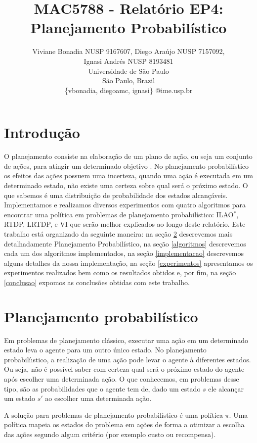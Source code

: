 \documentclass[12pt,a4paper]{article}
\title{MAC5788 - Relatório EP4: Planejamento Probabilístico}
\author{Viviane Bonadia NUSP 9167607, Diego Ara\'{u}jo NUSP 7157092, \\ Ignasi Andr\'{e}s NUSP 8193481\\
Universidade de S\~{a}o Paulo\\
S\~{a}o Paulo, Brazil\\ \{vbonadia, diegoamc, ignasi\} @ime.usp.br}
\begin{document}
\maketitle

\section{Introdução}


O planejamento consiste na elaboração de um plano de ação, ou seja um conjunto de ações, para atingir um determinado objetivo \cite{russell1995artificial}. No planejamento probabilístico os efeitos das ações possuem uma incerteza, quando uma ação é executada em um determinado estado, não existe uma certeza sobre qual será o próximo estado. O que sabemos é uma distribuição de probabilidade dos estados alcançáveis.
Implementamos e realizamos diversos experimentos com quatro algoritmos para encontrar uma política em problemas de planejamento probabilístico: ILAO$^*$, RTDP, LRTDP,  e VI que serão melhor explicados ao longo deste relatório. Este trabalho está organizado da seguinte maneira: na seção \ref{planejamento} descrevemos mais detalhadamente Planejamento Probabilístico, na seção \ref{algoritmos} descrevemos cada um dos algoritmos implementados, na seção \ref{implementacao} descrevemos alguns detalhes da nossa implementação, na seção \ref{experimentos} apresentamos os experimentos realizados bem como os resultados obtidos e, por fim, na seção \ref{conclusao} expomos as conclusões obtidas com este trabalho.


\section{Planejamento probabilístico} \label{planejamento}


Em problemas de planejamento clássico, executar uma ação em um determinado estado leva o agente para um outro único estado. No planejamento probabilíıstico, a realização de uma ação pode levar o agente à diferentes estados. Ou seja, não é possível saber com certeza qual será o próximo estado do agente após escolher uma determinada ação. O que conhecemos, em problemas desse tipo, são as probabilidades que o agente tem de, dado um estado  $s$ ele alcançar um estado $s'$ ao escolher uma determinada ação.

A solução para problemas de planejamento probabilístico é uma política $\pi$. Uma política mapeia os estados do problema em ações de forma a otimizar a escolha das ações segundo algum critério (por exemplo custo ou recompensa).
\end{document}
